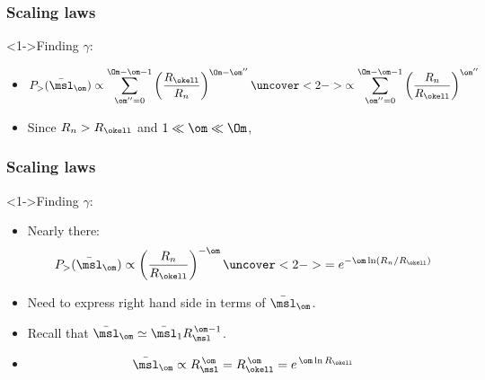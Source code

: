 \begin{frame}[label=]
  \frametitle{Scaling laws}

  \begin{block}<1->{Finding $\gamma$:}
    \begin{itemize}
    \item<1->
      $$
      P_> (\bar{\msl}_\om)
      \propto
      \sum_{\om''=0}^{\Om-\om-1} 
      \left(
        \frac{R_\okell}{R_n}
      \right)^{\Om-\om''}
      \uncover<2->{
        \propto
        \sum_{\om''=0}^{\Om-\om-1} 
        \left(
          \frac{R_n}{R_\okell}
        \right)^{\om''}
        }
      $$
    \item<3-> Since $R_n > R_\okell$ and $1 \ll \om \ll \Om$,
    \end{itemize}
  \end{block}

\end{frame}

\begin{frame}[label=]
  \frametitle{Scaling laws}

  \begin{block}<1->{Finding $\gamma$:}
    \begin{itemize}
    \item<1-> Nearly there:
      $$
      P_> (\bar{\msl}_\om)
      \propto
      \left(
        \frac{R_n}{R_\okell}
      \right)^{-\om}
      \uncover<2->{
        =
        e^{-\om \ln (R_n/R_\okell)}
      }
      $$
    \item<3-> 
      Need to express right hand side in terms of $\bar{\msl}_\om$.
    \item<4-> 
      Recall that $\bar{\msl}_\om \simeq \bar{\msl}_1 R_\msl^{\, \om-1}$.
    \item<5->
      $$
      \bar{\msl}_\om \propto R_\msl^{\, \om} = R_\okell^{\, \om} = e^{\, \om\ln{R_\okell}}
      $$
    \end{itemize}
  \end{block}

\end{frame}

